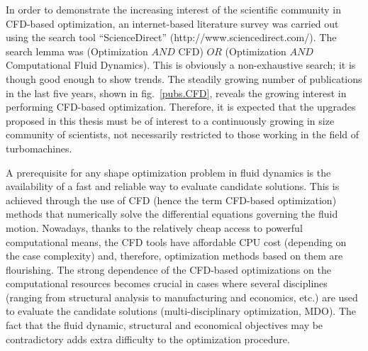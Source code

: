 In order to demonstrate the increasing interest of the scientific community in CFD-based optimization, an internet-based literature survey was carried out using the search tool ``ScienceDirect'' (http://www.sciencedirect.com/). The search lemma was (Optimization $AND$ CFD) $OR$ (Optimization $AND$ Computational Fluid Dynamics).  This is obviously a non-exhaustive search; it is though good enough to show trends.  The steadily growing number of publications in the last five years, shown in fig.\ \ref{pubs.CFD}, reveals the growing interest in performing CFD-based optimization. Therefore, it is expected that the upgrades proposed in this thesis must be of interest to a continuously growing in size community of scientists, not necessarily restricted to those working in the field of turbomachines.     
 
A prerequisite for any shape optimization problem in fluid dynamics is the availability of a fast and reliable way to evaluate candidate solutions. This is achieved through the use of CFD (hence the term CFD-based optimization) methods that numerically solve the differential equations governing the fluid motion. Nowadays, thanks to the relatively cheap access to powerful computational means, the CFD tools have affordable CPU cost (depending on the case complexity) and, therefore, optimization methods based on them are flourishing. The strong dependence of the CFD-based optimizations on the computational resources becomes crucial in cases where several disciplines (ranging from structural analysis to manufacturing and economics, etc.) are used to evaluate the candidate solutions (multi-disciplinary optimization, MDO). The fact that the fluid dynamic, structural and economical objectives may be contradictory adds extra difficulty to the optimization procedure.           
 
